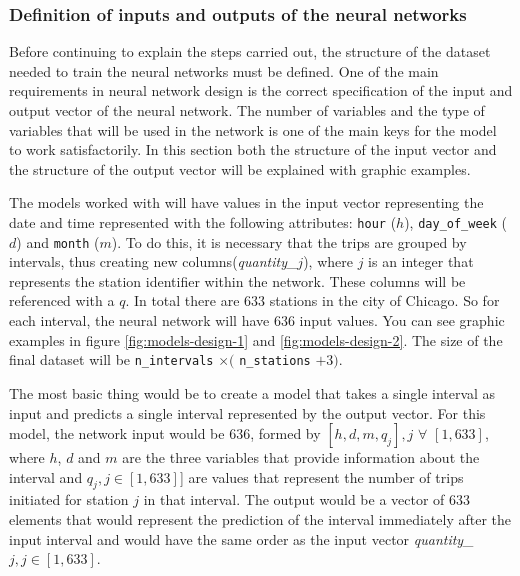 \subsubsection{Definition of inputs and outputs of the neural networks}\label{inputs-outputs}

Before continuing to explain the steps carried out, the structure of the dataset needed to train the neural networks must be defined. One of the main requirements in neural network design is the correct specification of the input and output vector of the neural network. The number of variables and the type of variables that will be used in the network is one of the main keys for the model to work satisfactorily. In this section both the structure of the input vector and the structure of the output vector will be explained with graphic examples.
\newline

The models worked with will have values in the input vector representing the date and time represented with the following attributes: \small{\verb|hour|} \normalsize ($h$), \small{\verb|day_of_week|} \normalsize ($d$) and \small{\verb|month|} \normalsize ($m$). To do this, it is necessary that the trips are grouped by intervals, thus creating new columns(\textit{quantity\_$j$}), where $j$ is an integer that represents the station identifier within the network. These columns will be referenced with a $q$. In total there are $633$ stations in the city of Chicago. So for each interval, the neural network will have $636$ input values. You can see graphic examples in figure \ref{fig:models-design-1} and \ref{fig:models-design-2}. The size of the final dataset will be \small\verb|n_intervals| $\times ($ \small\verb|n_stations| $+ 3)$\normalsize.
\newline

The most basic thing would be to create a model that takes a single interval as input and predicts a single interval represented by the output vector. For this model, the network input would be $636$, formed by $[h, d, m, q_j], j$ $ \forall$ $[1, 633]$, where $h$, $d$ and $m$ are the three variables that provide information about the interval and \textit{$q_j, j\in [1, 633]$}] are values that represent the number of trips initiated for station $j$  in that interval. The output would be a vector of $633$ elements that would represent the prediction of the interval immediately after the input interval and would have the same order as the input vector \textit{quantity\_$j, j\in [1, 633]$}.
\newline

